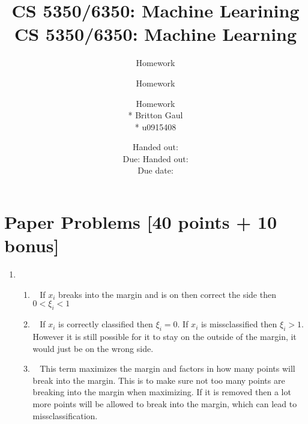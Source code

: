 \documentclass[12pt, fullpage,letterpaper]{article}
\title{CS 5350/6350: Machine Learining \semester}
\author{Homework \assignmentId}
\date{Handed out: \releaseDate\\
	Due: \dueDate}
\title{CS 5350/6350: Machine Learning \semester}
\author{Homework \assignmentId}
\date{Handed out: \releaseDate\\
  Due date: \dueDate}
\author{Homework \assignmentId \\* Britton Gaul \\* u0915408}
\begin{document}
\maketitle


\newcommand{\Hcal}{\mathcal{H}} 

\section{Paper Problems [40 points + 10 bonus]}
\begin{enumerate}
	\item~
		
	\begin{enumerate}
		\item~ 
		\newline If $x_i$ breaks into the margin and is on then correct the side then $0<\xi_i<1$
		\item~
		\newline If $x_i$ is correctly classified then $\xi_i=0$. If $x_i$ is missclassified then $\xi_i>1$. However it is still possible for it to stay on the outside of the margin, it would just be on the wrong side.
		\item~
		\newline This term maximizes the margin and factors in how many points will break into the margin. This is to make sure not too many points are breaking into the margin when maximizing. If it is removed then a lot more points will be allowed to break into the margin, which can lead to missclassification. 
	\end{enumerate}
	

\end{enumerate}
\end{document}
